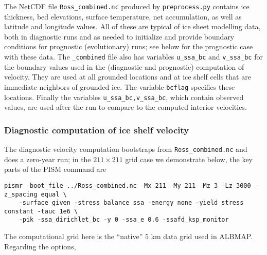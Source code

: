 The NetCDF file \texttt{Ross_combined.nc} produced by \texttt{preprocess.py} contains ice thickness, bed elevations, surface temperature, net accumulation, as well as latitude and longitude values.  All of these are typical of ice sheet modelling data, both in diagnostic runs and as needed to initialize and provide boundary conditions for prognostic (evolutionary) runs; see below for the prognostic case with these data.  The \texttt{_combined} file also has variables \texttt{u_ssa_bc} and \texttt{v_ssa_bc} for the boundary values used in the (diagnostic and prognostic) computation of velocity.  They are used at all grounded locations and at ice shelf cells that are immediate neighbors of grounded ice.  The variable \texttt{bcflag} specifies these locations.  Finally the variables \texttt{u_ssa_bc,v_ssa_bc}, which contain observed values, are used after the run to compare to the computed interior velocities.

\subsubsection*{Diagnostic computation of ice shelf velocity}  The diagnostic velocity computation bootstraps from \texttt{Ross_combined.nc} and does a zero-year run; in the $211\times 211$ grid case we demonstrate below, the key parts of the PISM command are

\begin{verbatim}
pismr -boot_file ../Ross_combined.nc -Mx 211 -My 211 -Mz 3 -Lz 3000 -z_spacing equal \
    -surface given -stress_balance ssa -energy none -yield_stress constant -tauc 1e6 \
    -pik -ssa_dirichlet_bc -y 0 -ssa_e 0.6 -ssafd_ksp_monitor
\end{verbatim}

\noindent The computational grid here is the ``native'' $5$ km data grid used in ALBMAP.  Regarding the options,

